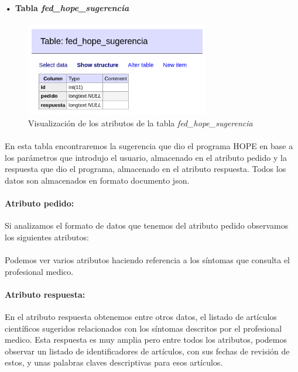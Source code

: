 \documentclass[10pt,a4paper,oneside]{book}
\begin{document}
\paragraph{• Tabla \textit{fed\_hope\_sugerencia}}

\paragraph{}
\begin{figure}[!htb]
  \centering
  \includegraphics[width=8cm]{images/metodologia_tabla_fed_hope_sugerencia.png}
  \caption{Visualización de los atributos de la tabla \textit{fed\_hope\_sugerencia}}
\end{figure}

\paragraph{}
En esta tabla encontraremos la sugerencia que dio el programa HOPE en base a los parámetros que introdujo el usuario, almacenado en el atributo pedido y la respuesta que dio el programa, almacenado en el atributo respuesta. Todos los datos son almacenados en formato documento json.

\newpage
\paragraph{\textbf{Atributo pedido}: } Si analizamos el formato de datos que tenemos del atributo pedido observamos los siguientes atributos:

\lstset{inputencoding=utf8/latin1}


\paragraph{}
Podemos ver varios atributos haciendo referencia a los síntomas que consulta el profesional medico.

\paragraph{\textbf{Atributo respuesta}: } En el atributo respuesta obtenemos entre otros datos, el listado de artículos científicos sugeridos relacionados con los síntomas descritos por el profesional medico. Esta respuesta es muy amplia pero entre todos los atributos, podemos observar un listado de identificadores de artículos, con sus fechas de revisión de estos, y unas palabras claves descriptivas para esos artículos.
\end{document}
